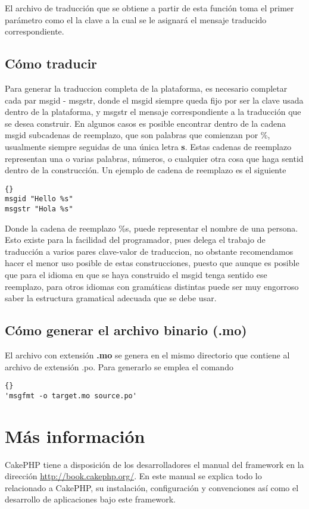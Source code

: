 El archivo de traducción que se obtiene a partir de esta función toma el primer parámetro como el la clave a la cual se le asignará el mensaje traducido correspondiente.

\subsection{Cómo traducir}
Para generar la traduccion completa de la plataforma, es necesario completar cada par msgid - msgstr, donde el msgid siempre queda fijo por ser la clave usada dentro de la plataforma, y msgstr el mensaje correspondiente a la traducción que se desea construir. En algunos casos es posible encontrar dentro de la cadena msgid subcadenas de reemplazo, que son palabras que comienzan por \%, usualmente siempre seguidas de una única letra \textbf{s}. Estas cadenas de reemplazo representan una o varias palabras, números, o cualquier otra cosa que haga sentid dentro de la construcción. Un ejemplo de cadena de reemplazo es el siguiente\\

\begin{lstlisting}{}
msgid "Hello %s"
msgstr "Hola %s"
\end{lstlisting}

Donde la cadena de reemplazo \%s, puede representar el nombre de una persona.\\

Esto existe para la facilidad del programador, pues delega el trabajo de traducción a varios pares clave-valor de traduccion, no obstante recomendamos hacer el menor uso posible de estas construcciones, puesto que aunque es posible que para el idioma en que se haya construido el msgid tenga sentido ese reemplazo, para otros idiomas con gramáticas distintas puede ser muy engorroso saber la estructura gramatical adecuada que se debe usar.\\

\subsection{Cómo generar el archivo binario (.mo)}
El archivo con extensión \textbf{.mo} se genera en el mismo directorio que contiene al archivo de extensión .po. Para generarlo se emplea el comando 
\begin{lstlisting}{}
'msgfmt -o target.mo source.po'
\end{lstlisting}

\section{Más información}
CakePHP tiene a disposición de los desarrolladores el manual del framework en la dirección \url{http://book.cakephp.org/}. En este manual se explica todo lo relacionado a CakePHP, su instalación, configuración y convenciones así como el desarrollo de aplicaciones bajo este framework.

